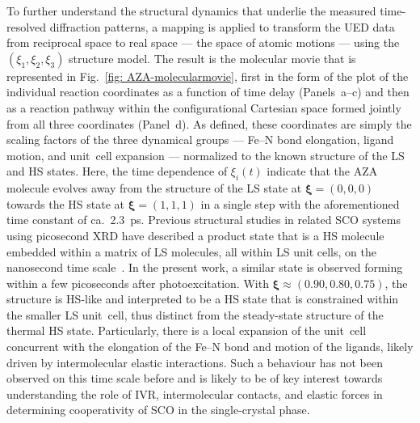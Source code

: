 To further understand the structural dynamics that underlie
the measured time-resolved diffraction patterns,
a mapping is applied to transform the UED data from reciprocal space to real space
--- the space of atomic motions --- using the $(\xi_1, \xi_2, \xi_3)$ structure model.
The result is the molecular movie that is represented in Fig.~\ref{fig: AZA-molecularmovie},
first in the form of the plot of the individual reaction coordinates
as a function of time delay (Panels~a--c) and then as a reaction pathway
within the configurational Cartesian space formed jointly from all three coordinates (Panel~d).
%
As defined, these coordinates are simply the scaling factors of the three dynamical groups
--- Fe--N bond elongation, ligand motion, and unit~cell expansion ---
normalized to the known structure of the LS and HS states.
%
Here, the time dependence of $\xi_i(t)$ indicate that the AZA molecule evolves
away from the structure of the LS state at $\boldsymbol{\xi} = (0, 0, 0)$
towards the HS state at $\boldsymbol{\xi} = (1, 1, 1)$ in a single step
with the aforementioned time constant of ca.~2.3~ps.
%
Previous structural studies in related SCO systems using picosecond XRD
have described a product state that is a HS molecule embedded within a matrix of LS molecules,
all within LS unit cells, on the nanosecond time scale~\cite{Collet2012a, Collet2012b, Bertoni2016a}.
%
In the present work, a similar state is observed forming within a few picoseconds
after photoexcitation. With $\boldsymbol{\xi} \approx (0.90, 0.80, 0.75)$,
the structure is HS-like and interpreted to be a HS state
that is constrained within the smaller LS unit~cell,
thus distinct from the steady-state structure of the thermal HS state.
%
Particularly, there is a local expansion of the unit~cell concurrent with
the elongation of the Fe--N bond and motion of the ligands,
likely driven by intermolecular elastic interactions.
%
Such a behaviour has not been observed on this time scale before
and is likely to be of key interest towards understanding
the role of IVR, intermolecular contacts, and elastic forces
in determining cooperativity of SCO in the single-crystal phase.

